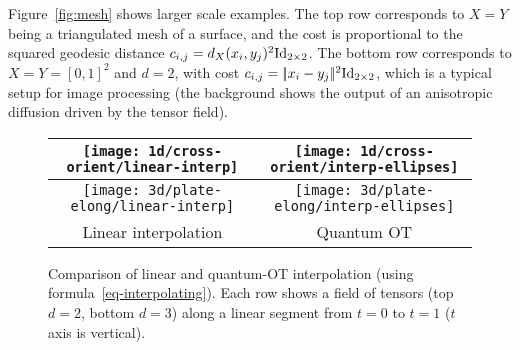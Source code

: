 Figure~\ref{fig:mesh} shows larger scale examples. The top row corresponds to $X=Y$ being a triangulated mesh of a surface, and the cost is proportional to the squared geodesic distance $c_{i,j}=d_X(x_i,y_j)^2 \mathrm{Id}_{2\times 2}$. The bottom row corresponds to $X=Y=[0,1]^2$ and $d=2$, with cost $c_{i,j}=|\!| x_i-y_j |\!|^2\mathrm{Id}_{2 \times 2}$, which is a typical setup for image processing (the background shows the output of an anisotropic diffusion driven by the tensor field).



\begin{figure}\centering
\begin{tabular}{@{}c@{}|@{}c@{}}
\texttt{[image: 1d/cross-orient/linear-interp]}&
\texttt{[image: 1d/cross-orient/interp-ellipses]}\\\hline
\texttt{[image: 3d/plate-elong/linear-interp]}&
\texttt{[image: 3d/plate-elong/interp-ellipses]}\\\hline
Linear interpolation & Quantum OT
\end{tabular}
\caption{Comparison of linear and quantum-OT interpolation (using formula~\eqref{eq-interpolating}). 
Each row shows a field of tensors (top $d=2$, bottom $d=3$) along a linear segment from $t=0$ to $t=1$ ($t$ axis is vertical).
} \label{fig:1d-interp}
\end{figure}
